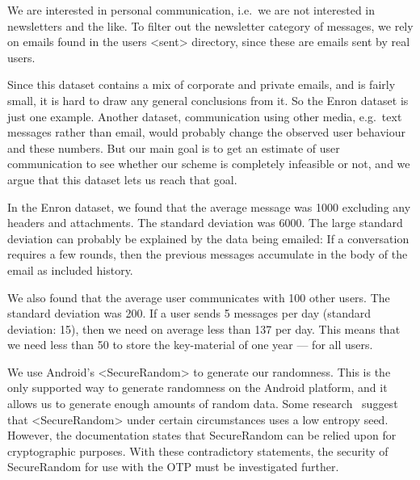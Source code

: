 We are interested in personal communication, i.e.~we are not interested in 
newsletters and the like.
To filter out the newsletter category of messages, we rely on emails found in 
the users <sent> directory, since these are emails sent by real users.


Since this dataset contains a mix of corporate and private emails, and is 
fairly small, it is hard to draw any general conclusions from it.
So the Enron dataset is just one example.
Another dataset, communication using other media, e.g.~text messages rather 
than email, would probably change the observed user behaviour and these 
numbers.
But our main goal is to get an estimate of user communication to see whether 
our scheme is completely infeasible or not, and we argue that this dataset lets 
us reach that goal.

In the Enron dataset, we found that the average message was
\unit{1000}{\byte}
excluding any headers and attachments.
The standard deviation was
\unit{6000}{\byte}.
The large standard deviation can probably be explained by the data being 
emailed:
If a conversation requires a few rounds, then the previous messages accumulate 
in the body of the email as included history.

We also found that the average user communicates with
100
other users.
The standard deviation was
200.
If a user sends
5
messages per day (standard deviation: 15), then we need on average less than
\unit{137}{\kibi\byte}
per day.
This means that we need less than
\unit{50}{\mebi\byte}
to store the key-material of one year --- for all users.


We use Android's <SecureRandom> to generate our randomness.
This is the only supported way to generate randomness on the Android platform, 
and it allows us to generate enough amounts of random data.
Some research~\cite{AndroidLowEntropyMyth,JavaRandomness} suggest that 
<SecureRandom> under certain circumstances uses a low entropy seed.
However, the documentation states that SecureRandom can be relied upon for 
cryptographic purposes.
With these contradictory statements, the security of SecureRandom for use with 
the \ac{OTP} must be investigated further.

